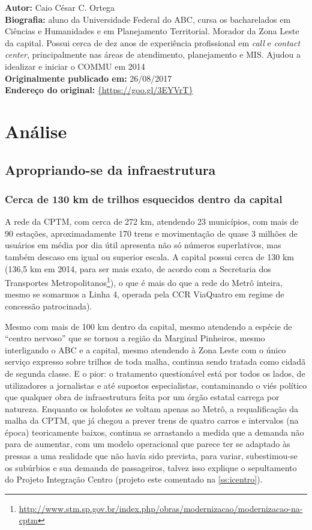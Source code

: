 \documentclass[11pt,fleqn]{book} %
\newcommand{\infocaio}[2]{\textbf{Autor:} Caio C\'{e}sar C. Ortega \\ \textbf{Biografia:} aluno da Universidade Federal do ABC, cursa os bacharelados em Ci\^{e}ncias e Humanidades e em Planejamento Territorial. Morador da Zona Leste da capital. Possui cerca de dez anos de experi\^{e}ncia profissional em \textit{call} e \textit{contact center}, principalmente nas \'{a}reas de atendimento, planejamento e MIS. Ajudou a idealizar e iniciar o COMMU em 2014 \\ \textbf{Originalmente publicado em:} {#1} \\ \textbf{Endere\c{c}o do original:} \url{{#2}}}
\begin{document}
\begin{info}
	\infocaio{26/08/2017}{https://goo.gl/3EYVrT}
\end{info}


\part{Análise}

\chapter{Apropriando-se da infraestrutura}

\section{Cerca de 130 km de trilhos esquecidos dentro da capital}

A rede da CPTM, com cerca de 272 km, atendendo 23 municípios, com mais de 90 estações, aproximadamente 170 trens e movimentação de quase 3 milhões de usuários em média por dia útil apresenta não só números superlativos, mas também descaso em igual ou superior escala. A capital possui cerca de 130 km (136,5 km em 2014, para ser mais exato, de acordo com a Secretaria dos Transportes Metropolitanos\footnote{\url{http://www.stm.sp.gov.br/index.php/obras/modernizacao/modernizacao-na-cptm}}), o que é mais do que a rede do Metrô inteira, mesmo se somarmos a Linha 4, operada pela CCR ViaQuatro em regime de concessão patrocinada).

Mesmo com mais de 100 km dentro da capital, mesmo atendendo a espécie de “centro nervoso” que se tornou a região da Marginal Pinheiros, mesmo interligando o ABC e a capital, mesmo atendendo à Zona Leste com o único serviço expresso sobre trilhos de toda malha, continua sendo tratada como cidadã de segunda classe. E o pior: o tratamento questionável está por todos os lados, de utilizadores a jornalistas e até supostos especialistas, contaminando o viés político que qualquer obra de infraestrutura feita por um órgão estatal carrega por natureza. Enquanto os holofotes se voltam apenas ao Metrô, a requalificação da malha da CPTM, que já chegou a prever trens de quatro carros e intervalos (na época) teoricamente baixos, continua se arrastando a medida que a demanda não para de aumentar, com um modelo operacional que parece ter se adaptado às pressas a uma realidade que não havia sido prevista, para variar, subestimou-se os subúrbios e sua demanda de passageiros, talvez isso explique o sepultamento do Projeto Integração Centro (projeto este comentado na \autoref{ss:icentro}).
\end{document}
